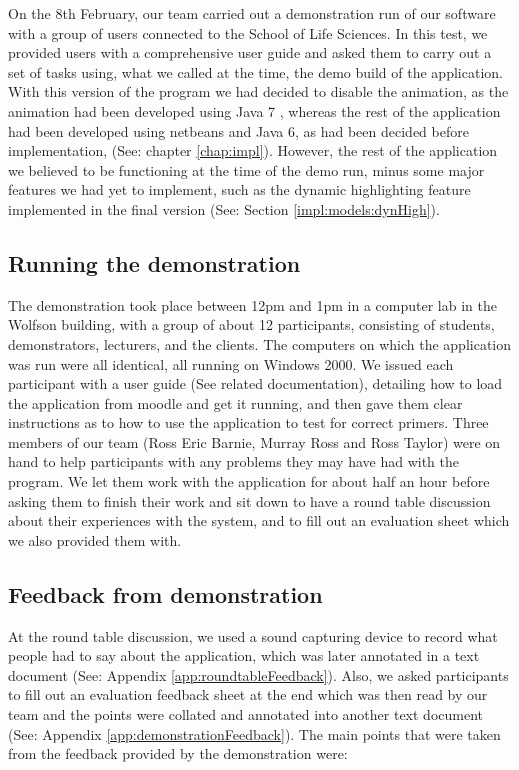 On the 8th February, our team carried out a demonstration run of our software with a group of users connected to the School of Life Sciences. In this test, we provided users with a comprehensive user guide and asked them to carry out a set of tasks using, what we called at the time, the demo build of the application. With this version of the program we had decided to disable the animation, as the animation had been developed using Java 7 \cite{Java7SwingAPI}, whereas the rest of the application had been developed using netbeans and Java 6, as had been decided before implementation, (See: chapter \ref{chap:impl}). However, the rest of the application we believed to be functioning at the time of the demo run, minus some major features we had yet to implement, such as the dynamic highlighting feature implemented in the final version (See: Section \ref{impl:models:dynHigh}).

\subsection{Running the demonstration}

The demonstration took place between 12pm and 1pm in a computer lab in the Wolfson building, with a group of about 12 participants, consisting of students, demonstrators, lecturers, and the clients. The computers on which the application was run were all identical, all running on Windows 2000. We issued each participant with a user guide (See related documentation), detailing how to load the application from moodle and get it running, and then gave them clear instructions as to how to use the application to test for correct primers. Three members of our team (Ross Eric Barnie, Murray Ross and Ross Taylor) were on hand to help participants with any problems they may have had with the program. We let them work with the application for about half an hour before asking them to finish their work and sit down to have a round table discussion about their experiences with the system, and to fill out an evaluation sheet which we also provided them with.

\subsection{Feedback from demonstration}

At the round table discussion, we used a sound capturing device to record what people had to say about the application, which was later annotated in a text document (See: Appendix \ref{app:roundtableFeedback}). Also, we asked participants to fill out an evaluation feedback sheet at the end which was then read by our team and the points were collated and annotated into another text document (See: Appendix \ref{app:demonstrationFeedback}). The main points that were taken from the feedback provided by the demonstration were:

